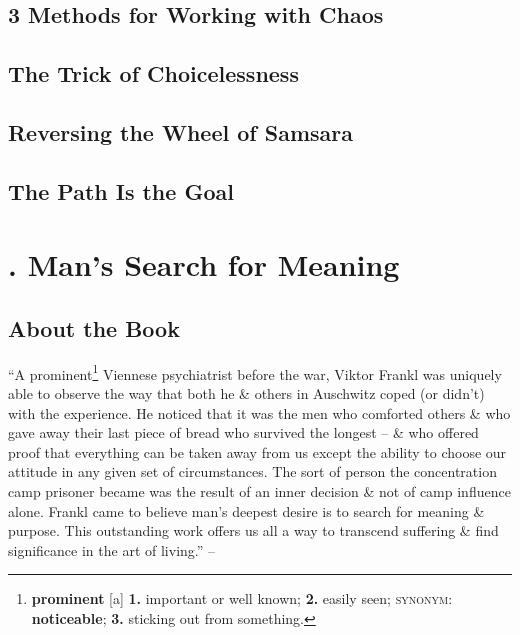 \documentclass[oneside]{book}
\numberwithin{equation}{section}
\begin{document}

\section{3 Methods for Working with Chaos}


\section{The Trick of Choicelessness}


\section{Reversing the Wheel of Samsara}


\section{The Path Is the Goal}


\chapter{\cite{Frankl2013, Frankl2017, Frankl2022}. Man's Search for Meaning}

\section*{About the Book}
``A prominent\footnote{\textbf{prominent} [a] \textbf{1.} important or well known; \textbf{2.} easily seen; \textsc{synonym}: \textbf{noticeable}; \textbf{3.} sticking out from something.} Viennese psychiatrist before the war, Viktor Frankl was uniquely able to observe the way that both he \& others in Auschwitz coped (or didn't) with the experience. He noticed that it was the men who comforted others \& who gave away their last piece of bread who survived the longest -- \& who offered proof that everything can be taken away from us except the ability to choose our attitude in any given set of circumstances. The sort of person the concentration camp prisoner became was the result of an inner decision \& not of camp influence alone. Frankl came to believe man's deepest desire is to search for meaning \& purpose. This outstanding work offers us all a way to transcend suffering \& find significance in the art of living.'' -- \cite[About the Book, p. 3]{Frankl2013}
\end{document}

